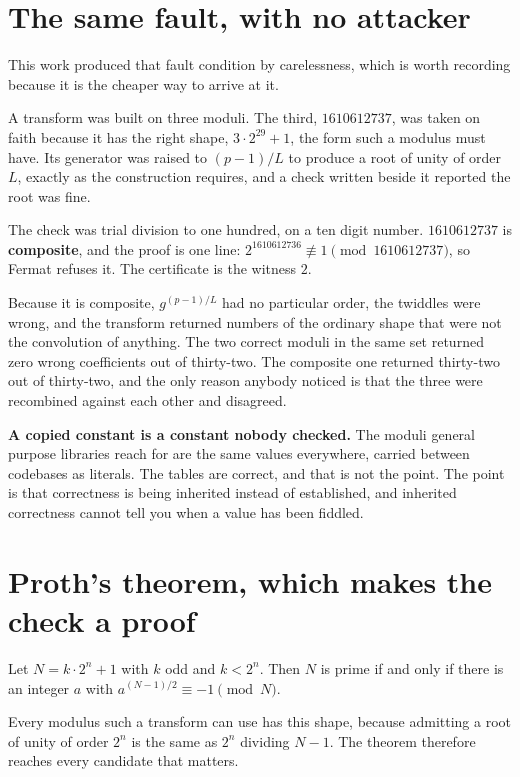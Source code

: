 \section{The same fault, with no attacker}

This work produced that fault condition by carelessness, which is worth recording because it is the cheaper way to arrive at it.

A transform was built on three moduli. The third, \(1610612737\), was taken on faith because it has the right shape, \(3 \cdot 2^{29} + 1\), the form such a modulus must have. Its generator was raised to \((p-1)/L\) to produce a root of unity of order \(L\), exactly as the construction requires, and a check written beside it reported the root was fine.

The check was trial division to one hundred, on a ten digit number. \(1610612737\) is \textbf{composite}, and the proof is one line: \(2^{1610612736} \not\equiv 1 \pmod{1610612737}\), so Fermat refuses it. The certificate is the witness \(2\).

Because it is composite, \(g^{(p-1)/L}\) had no particular order, the twiddles were wrong, and the transform returned numbers of the ordinary shape that were not the convolution of anything. The two correct moduli in the same set returned zero wrong coefficients out of thirty-two. The composite one returned thirty-two out of thirty-two, and the only reason anybody noticed is that the three were recombined against each other and disagreed.

\textbf{A copied constant is a constant nobody checked.} The moduli general purpose libraries reach for are the same values everywhere, carried between codebases as literals. The tables are correct, and that is not the point. The point is that correctness is being inherited instead of established, and inherited correctness cannot tell you when a value has been fiddled.

\section{Proth's theorem, which makes the check a proof}

\begin{theorem}[Proth]
Let \(N = k \cdot 2^n + 1\) with \(k\) odd and \(k < 2^n\). Then \(N\) is prime if and only if there is an integer \(a\) with \(a^{(N-1)/2} \equiv -1 \pmod N\).
\end{theorem}

Every modulus such a transform can use has this shape, because admitting a root of unity of order \(2^n\) is the same as \(2^n\) dividing \(N-1\). The theorem therefore reaches every candidate that matters.

